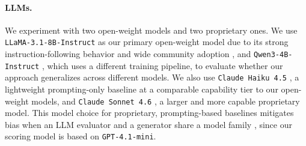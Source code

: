\documentclass[11pt]{article}
\begin{document}
\paragraph{LLMs.}
We experiment with two open-weight models and two proprietary ones. %
We use \texttt{LLaMA-3.1-8B-Instruct} as our primary open-weight model due to its strong instruction-following behavior and wide community adoption \cite{grattafiori2024llama3herdmodels}, and \texttt{Qwen3-4B-Instruct} \cite{yang2025qwen3technicalreport}, which uses a different training pipeline, to evaluate whether our approach generalizes across different models. We also use \texttt{Claude Haiku 4.5} \cite{anthropic2025haiku45}, a lightweight prompting-only baseline at a comparable capability tier to our open-weight models, and \texttt{Claude Sonnet 4.6} \cite{anthropic2025sonnet46}, a larger and more capable proprietary model. This model choice for proprietary, prompting-based baselines mitigates bias when an LLM evaluator and a generator share a model family \cite{panickssery2024llmevaluators}, since our scoring model is based on \texttt{GPT-4.1-mini}.


\end{document}
